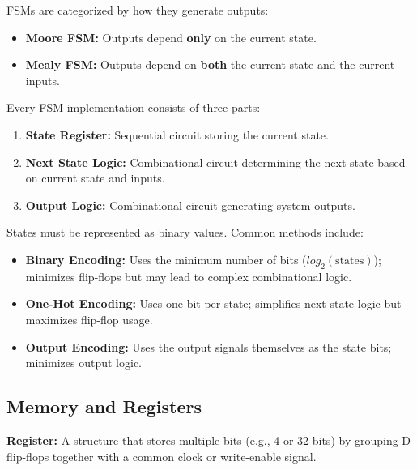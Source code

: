 \begin{theorem}
FSMs are categorized by how they generate outputs:
\begin{itemize}
    \item \textbf{Moore FSM:} Outputs depend \textbf{only} on the current state.
    \item \textbf{Mealy FSM:} Outputs depend on \textbf{both} the current state and the current inputs.
\end{itemize}
\end{theorem}

\begin{remark}
Every FSM implementation consists of three parts:
\begin{enumerate}
    \item \textbf{State Register:} Sequential circuit storing the current state.
    \item \textbf{Next State Logic:} Combinational circuit determining the next state based on current state and inputs.
    \item \textbf{Output Logic:} Combinational circuit generating system outputs.
\end{enumerate}
\end{remark}

\begin{example}
States must be represented as binary values. Common methods include:
\begin{itemize}
    \item \textbf{Binary Encoding:} Uses the minimum number of bits ($log_2(\text{states})$); minimizes flip-flops but may lead to complex combinational logic.
    \item \textbf{One-Hot Encoding:} Uses one bit per state; simplifies next-state logic but maximizes flip-flop usage.
    \item \textbf{Output Encoding:} Uses the output signals themselves as the state bits; minimizes output logic.
\end{itemize}
\end{example}

\subsection{Memory and Registers}

\begin{definition}
\textbf{Register:} A structure that stores multiple bits (e.g., 4 or 32 bits) by grouping D flip-flops together with a common clock or write-enable signal.
\end{definition}

